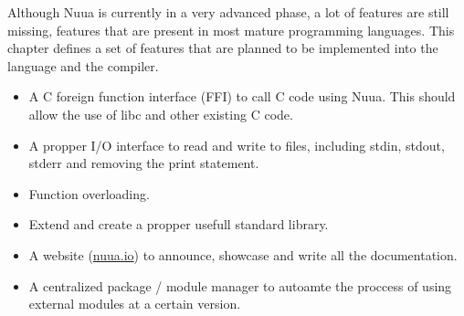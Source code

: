 Although Nuua is currently in a very advanced phase, a lot of features are still missing, features that are present in most
mature programming languages. This chapter defines a set of features that are planned to be implemented into the language and
the compiler.

\begin{itemize}
    \item A C foreign function interface (FFI) to call C code using Nuua. This should allow the use of libc and other existing C code.
    \item A propper I/O interface to read and write to files, including stdin, stdout, stderr and removing the print statement.
    \item Function overloading.
    \item Extend and create a propper usefull standard library.
    \item A website (\href{https://nuua.io}{nuua.io}) to announce, showcase and write all the documentation.
    \item A centralized package / module manager to autoamte the proccess of using external modules at a certain version.
\end{itemize}
